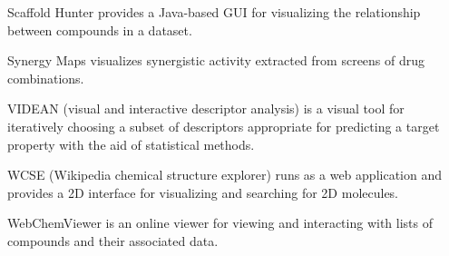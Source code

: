  Scaffold Hunter \cite{Wetzel_2009} provides a Java-based GUI for visualizing the relationship between compounds in a dataset.

Synergy Maps \cite{Lewis_2015} visualizes synergistic activity extracted from screens of drug combinations. 

VIDEAN (visual and interactive descriptor analysis) \cite{Mart_nez_2015} is a visual tool for iteratively choosing a subset of descriptors appropriate for predicting a target property with the aid of statistical methods.  

WCSE (Wikipedia chemical structure explorer) \cite{Ertl_2015} runs as a web application and provides a 2D interface for visualizing and searching for 2D molecules.

WebChemViewer  \cite{Durrant_2014} is an online viewer for viewing and interacting with lists of compounds and their associated data.
